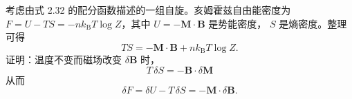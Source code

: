  考虑由式 2.32 的配分函数描述的一组自旋。亥姆霍兹自由能密度为
$F=U-TS=-nk_{\mathrm{B}}T\log Z$，其中 $U=-\mathbf{M}\cdot\mathbf{B}$ 是势能密度，
$S$ 是熵密度。整理可得
\begin{equation*}
TS = -\mathbf{M}\cdot\mathbf{B} + nk_{\mathrm{B}}T\log Z.\tag{2.91}
\end{equation*}
证明：温度不变而磁场改变 $\delta\mathbf{B}$ 时，
\begin{equation*}
T\,\delta S = -\mathbf{B}\cdot\delta\mathbf{M}\tag{2.92}
\end{equation*}
从而
\begin{equation*}
\delta F = \delta U - T\,\delta S = -\mathbf{M}\cdot\delta\mathbf{B}.\tag{2.93}
\end{equation*}
